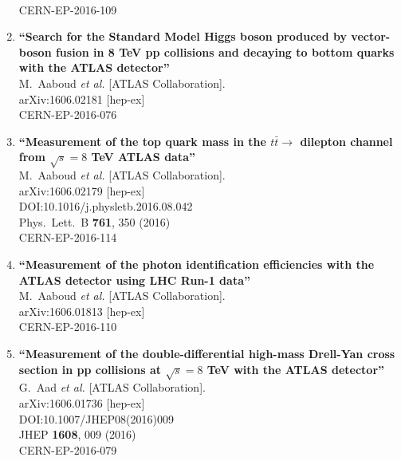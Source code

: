 \documentclass{article}
\begin{document}
\begin{enumerate}
  \\{}CERN-EP-2016-109
\item%
{\bf ``Search for the Standard Model Higgs boson produced by vector-boson fusion in 8 TeV pp collisions and decaying to bottom quarks with the ATLAS detector''}
  \\{}M.~Aaboud {\it et al.} [ATLAS Collaboration].
  \\{}arXiv:1606.02181 [hep-ex]
  \\{}CERN-EP-2016-076
\item%
{\bf ``Measurement of the top quark mass in the $t\bar{t}\to$ dilepton channel from $\sqrt{s}=8$ TeV ATLAS data''}
  \\{}M.~Aaboud {\it et al.} [ATLAS Collaboration].
  \\{}arXiv:1606.02179 [hep-ex]
  \\{}DOI:10.1016/j.physletb.2016.08.042
  \\{}Phys.\ Lett.\ B {\bf 761}, 350 (2016)
  \\{}CERN-EP-2016-114
\item%
{\bf ``Measurement of the photon identification efficiencies with the ATLAS detector using LHC Run-1 data''}
  \\{}M.~Aaboud {\it et al.} [ATLAS Collaboration].
  \\{}arXiv:1606.01813 [hep-ex]
  \\{}CERN-EP-2016-110
\item%
{\bf ``Measurement of the double-differential high-mass Drell-Yan cross section in pp collisions at $ \sqrt{s}=8 $ TeV with the ATLAS detector''}
  \\{}G.~Aad {\it et al.} [ATLAS Collaboration].
  \\{}arXiv:1606.01736 [hep-ex]
  \\{}DOI:10.1007/JHEP08(2016)009
  \\{}JHEP {\bf 1608}, 009 (2016)
  \\{}CERN-EP-2016-079

\end{enumerate}
\end{document}
